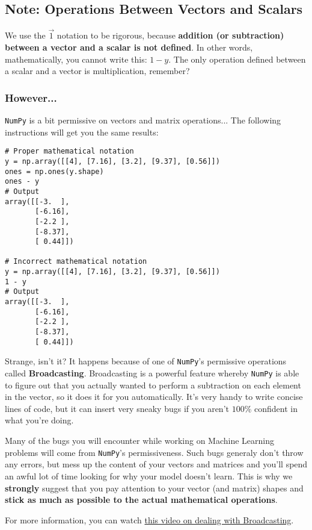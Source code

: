 \subsection*{Note: Operations Between Vectors and Scalars}
We use the $\vec{1}$ notation to be rigorous, because \textbf{addition (or subtraction) between a vector and a scalar is not defined}.
In other words, mathematically, you cannot write this: $1 - y$.
The only operation defined between a scalar and a vector is multiplication, remember?

\subsubsection*{However...}
\texttt{NumPy} is a bit permissive on vectors and matrix operations...
The following instructions will get you the same results:

\begin{verbatim}
# Proper mathematical notation
y = np.array([[4], [7.16], [3.2], [9.37], [0.56]])
ones = np.ones(y.shape)
ones - y
# Output
array([[-3.  ],
       [-6.16],
       [-2.2 ],
       [-8.37],
       [ 0.44]])

# Incorrect mathematical notation
y = np.array([[4], [7.16], [3.2], [9.37], [0.56]])
1 - y
# Output
array([[-3.  ],
       [-6.16],
       [-2.2 ],
       [-8.37],
       [ 0.44]])
\end{verbatim}

Strange, isn't it?
It happens because of one of \texttt{NumPy}'s permissive operations called \textbf{Broadcasting}.
Broadcasting is a powerful feature whereby \texttt{NumPy} is able to figure out that you actually wanted to perform a subtraction on each element in the vector, so it does it for you automatically.
It's very handy to write concise lines of code, but it can insert very sneaky bugs if you aren't $100$\% confident in what you're doing.


Many of the bugs you will encounter while working on Machine Learning problems will come from \texttt{NumPy}'s permissiveness.
Such bugs generaly don't throw any errors, but mess up the content of your vectors and matrices and you'll spend an awful lot of time looking for why your model doesn't learn.
This is why we \textbf{strongly} suggest that you pay attention to your vector (and matrix) shapes and \textbf{stick as much as possible to the actual mathematical operations}.

For more information, you can watch \href{https://www.youtube.com/watch?v=V2QlTmh6P2Y&t=213s}{this video on dealing with Broadcasting}.
